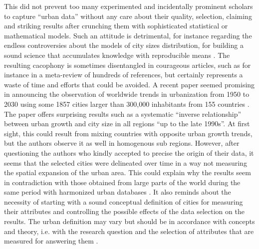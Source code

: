 \documentclass[10pt,letterpaper]{article}
\begin{document}
This did not prevent too many experimented and incidentally prominent scholars to capture “urban data” without any care about their quality, selection, claiming and striking results after crunching them with sophisticated statistical or mathematical models. Such an attitude is detrimental, for instance regarding the endless controversies about the models of city sizes distribution, for building a sound science that accumulates knowledge with reproducible means \citep{pumain2012theorie}. The resulting cacophony is sometimes disentangled in courageous articles, such as for instance \citep{cottineau2017metazipf,cottineau2020metametazipf} in a meta-review of hundreds of references, but certainly represents a waste of time and efforts that could be avoided. A recent paper seemed promising in announcing the observation of worldwide trends in urbanization from 1950 to 2030 using some 1857 cities larger than 300,000 inhabitants from 155 countries \citep{egidi2020long}. The paper offers surprising results such as a systematic ``inverse relationship'' between urban growth and city size in all regions ``up to the late 1990s''. At first sight, this could result from mixing countries with opposite urban growth trends, but the authors observe it as well in homogenous sub regions. However, after questioning the authors who kindly accepted to precise the origin of their data, it seems that the selected cities were delineated over time in a way not measuring the spatial expansion of the urban area. This could explain why the results seem in contradiction with those obtained from large parts of the world during the same period with harmonized urban databases \citep{cura2017old}. It also reminds about the necessity of starting with a sound conceptual definition of cities for measuring their attributes and controlling the possible effects of the data selection on the results. The urban definition may vary but should be in accordance with concepts and theory, i.e. with the research question and the selection of attributes that are measured for answering them \citep{rozenblat2020extending}.
\end{document}
